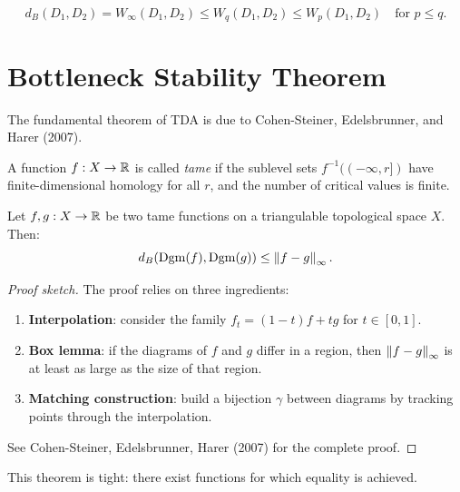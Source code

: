 \begin{keyformulas}[title=\textbf{Relationship between Distances}]
\[
  d_B(D_1, D_2) = W_\infty(D_1, D_2) \leq W_q(D_1, D_2) \leq
  W_p(D_1, D_2) \quad \text{for } p \leq q.
\]
\end{keyformulas}

\section{Bottleneck Stability Theorem}

The fundamental theorem of TDA is due to Cohen-Steiner, Edelsbrunner,
and Harer (2007).

\begin{definition}
A function $f : X \to \mathbb{R}$ is called \emph{tame} if the sublevel sets
$f^{-1}((-\infty, r])$ have finite-dimensional homology for all $r$,
and the number of critical values is finite.
\end{definition}

\begin{theorem}
Let $f, g : X \to \mathbb{R}$ be two tame functions on a triangulable
topological space $X$. Then:
\[
  d_B(\mathrm{Dgm}(f), \mathrm{Dgm}(g))
  \leq \left\| f - g \right\|_\infty.
\]
\end{theorem}

\begin{proof}[Proof sketch]
The proof relies on three ingredients:
\begin{enumerate}
  \item \textbf{Interpolation}: consider the family
        $f_t = (1-t)f + tg$ for $t \in [0, 1]$.
  \item \textbf{Box lemma}: if the diagrams of $f$ and $g$ differ in a
        region, then $\left\| f - g \right\|_\infty$ is at least as large as the
        size of that region.
  \item \textbf{Matching construction}: build a bijection $\gamma$
        between diagrams by tracking points through the interpolation.
\end{enumerate}
See Cohen-Steiner, Edelsbrunner, Harer (2007) for the complete proof.
\end{proof}

\begin{remark}
This theorem is tight: there exist functions for which equality is
achieved.
\end{remark}

